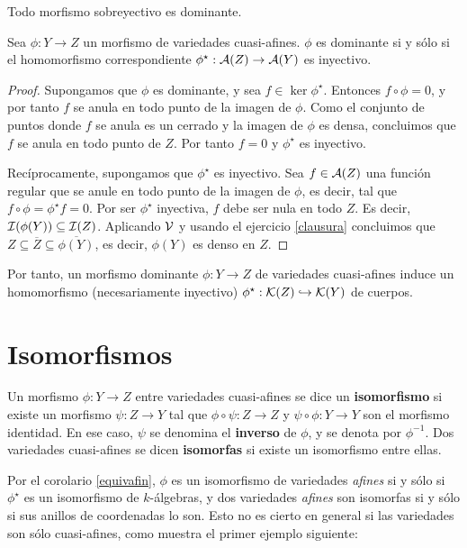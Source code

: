 \documentclass[ACGA.tex]{subfiles}
\begin{document}
\begin{nota}
Todo morfismo sobreyectivo es dominante.
\end{nota}

\begin{prop}\label{dominanteinyectivo}
 Sea $\phi:Y\to Z$ un morfismo de variedades cuasi-afines. $\phi$ es dominante si y sólo si el homomorfismo correspondiente $\phi^\star:\mathcal{A}(Z)\to\mathcal{A}(Y)$ es inyectivo.
\end{prop}

\begin{proof}
 Supongamos que $\phi$ es dominante, y sea $f\in\ker\phi^\star$. Entonces $f\circ\phi=0$, y por tanto $f$ se anula en todo punto de la imagen de $\phi$. Como el conjunto de puntos donde $f$ se anula es un cerrado y la imagen de $\phi$ es densa, concluimos que $f$ se anula en todo punto de $Z$. Por tanto $f=0$ y $\phi^\star$ es inyectivo.

Recíprocamente, supongamos que $\phi^\star$ es inyectivo. Sea $f\in\mathcal{A}(Z)$ una función regular que se anule en todo punto de la imagen de $\phi$, es decir, tal que $f\circ\phi=\phi^\star f=0$. Por ser $\phi^\star$ inyectiva, $f$ debe ser nula en todo $Z$. Es decir, $\mathcal{I}(\phi(Y))\subseteq\mathcal{I}(Z)$. Aplicando $\mathcal{V}$ y usando el ejercicio \ref{clausura} concluimos que $Z\subseteq\overline Z\subseteq\overline{\phi(Y)}$, es decir, $\phi(Y)$ es denso en $Z$. 
\end{proof}

Por tanto, un morfismo dominante $\phi:Y\to Z$ de variedades cuasi-afines induce un homomorfismo (necesariamente inyectivo) $\phi^\star:{\mathcal K}(Z)\hookrightarrow{\mathcal K}(Y)$ de cuerpos.


\section{Isomorfismos}

\begin{defi} Un morfismo $\phi:Y\to Z$ entre variedades cuasi-afines se dice un {\bf isomorfismo} si existe un morfismo $\psi:Z\to Y$ tal que $\phi\circ \psi:Z\to Z$ y $\psi\circ \phi:Y\to Y$ son el morfismo identidad. En ese caso, $\psi$ se denomina el {\bf inverso} de $\phi$, y se denota por $\phi^{-1}$. Dos variedades cuasi-afines se dicen {\bf isomorfas} si existe un isomorfismo entre ellas.
 \end{defi}

 Por el corolario \ref{equivafin}, $\phi$ es un isomorfismo de variedades \emph{afines} si y sólo si $\phi^\star$ es un isomorfismo de $k$-álgebras, y dos variedades \emph{afines} son isomorfas si y sólo si sus anillos de coordenadas lo son. Esto no es cierto en general si las variedades son sólo cuasi-afines, como muestra el primer ejemplo siguiente:
\end{document}
